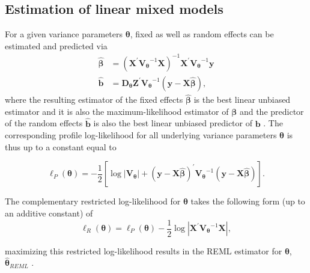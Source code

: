 \subsection{Estimation of linear mixed models}
\label{sec:2.1estimation}

For a given variance parameters $ \boldsymbol \theta$, fixed as well as random effects can be estimated and predicted via  
\begin{equation} 
   \label{equ:2.2nonstacked}
   \begin{aligned} 
       \hat{ \boldsymbol \beta} &=\left( \boldsymbol X^{\prime}  \boldsymbol{V_{\theta}}^{-1}  \boldsymbol X\right)^{-1}  \boldsymbol X^{\prime}  \boldsymbol{V_{\theta}}^{-1}  \boldsymbol y \\ 
       \hat{ \boldsymbol b} &= \boldsymbol D_{\boldsymbol \theta} \boldsymbol Z^{\prime}  \boldsymbol{V_{\theta}}^{-1}( \boldsymbol y- \boldsymbol X \hat{ \boldsymbol \beta}), 
   \end{aligned}
\end{equation}
where the resulting estimator of the fixed effects $\hat{\boldsymbol \beta}$ is the best linear unbiased estimator and it is also the maximum-likelihood estimator of $\boldsymbol \beta$ and the predictor of the random effects $\hat{\boldsymbol b}$ is also the best linear unbiased predictor of $\boldsymbol{b}$ \citep{harville1976extension}. The corresponding profile log-likelihood for all underlying variance parameters $ \boldsymbol \theta$ is thus up to a constant equal to

\begin{equation} 
\label{ml}
\ell_{P}(\boldsymbol \theta)=-\frac{1}{2}\left[\log |\boldsymbol{V_{\theta}}|+(\boldsymbol y-\boldsymbol X \hat{\boldsymbol \beta})^{\prime} \boldsymbol{V_{\theta}}^{-1}(\boldsymbol y-\boldsymbol X \hat{\boldsymbol \beta})\right].
\end{equation}


The complementary restricted log-likelihood for $\boldsymbol \theta$ takes the following form (up to an additive constant) of
\begin{equation}
\label{reml}
   \ell_{R}( \boldsymbol \theta)=\ell_{P}(\boldsymbol \theta)-\frac{1}{2} \log \left| \boldsymbol X^{\prime}  \boldsymbol{V_{\theta}}^{-1}  \boldsymbol X\right|,
\end{equation}

maximizing this restricted log-likelihood results in the REML estimator for $ \boldsymbol \theta$, $\hat{ \boldsymbol \theta}_{REML}$ \citep{harville1976extension}. 
